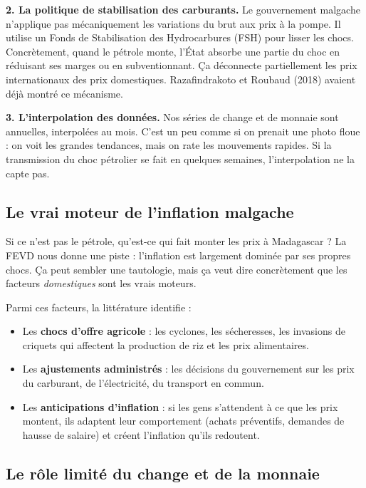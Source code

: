 \documentclass[12pt,a4paper]{article}
\begin{document}
\textbf{2. La politique de stabilisation des carburants.} Le gouvernement malgache n'applique pas mécaniquement les variations du brut aux prix à la pompe. Il utilise un Fonds de Stabilisation des Hydrocarbures (FSH) pour lisser les chocs. Concrètement, quand le pétrole monte, l'État absorbe une partie du choc en réduisant ses marges ou en subventionnant. Ça déconnecte partiellement les prix internationaux des prix domestiques. Razafindrakoto et Roubaud (2018) avaient déjà montré ce mécanisme.

\textbf{3. L'interpolation des données.} Nos séries de change et de monnaie sont annuelles, interpolées au mois. C'est un peu comme si on prenait une photo floue : on voit les grandes tendances, mais on rate les mouvements rapides. Si la transmission du choc pétrolier se fait en quelques semaines, l'interpolation ne la capte pas.

\subsection{Le vrai moteur de l'inflation malgache}

Si ce n'est pas le pétrole, qu'est-ce qui fait monter les prix à Madagascar ? La FEVD nous donne une piste : l'inflation est largement dominée par ses propres chocs. Ça peut sembler une tautologie, mais ça veut dire concrètement que les facteurs \emph{domestiques} sont les vrais moteurs.

Parmi ces facteurs, la littérature identifie :
\begin{itemize}
  \item Les \textbf{chocs d'offre agricole} : les cyclones, les sécheresses, les invasions de criquets qui affectent la production de riz et les prix alimentaires.
  \item Les \textbf{ajustements administrés} : les décisions du gouvernement sur les prix du carburant, de l'électricité, du transport en commun.
  \item Les \textbf{anticipations d'inflation} : si les gens s'attendent à ce que les prix montent, ils adaptent leur comportement (achats préventifs, demandes de hausse de salaire) et créent l'inflation qu'ils redoutent.
\end{itemize}

\subsection{Le rôle limité du change et de la monnaie}
\end{document}
